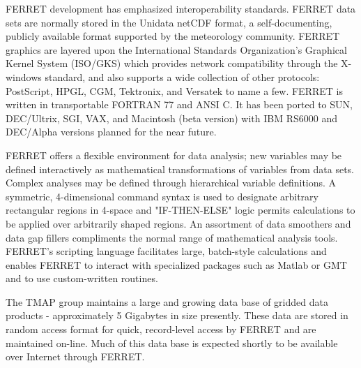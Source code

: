 	FERRET development has emphasized interoperability standards.  
FERRET data sets are normally stored in the Unidata netCDF format, a 
self-documenting, publicly available format supported by the meteorology 
community.  FERRET graphics are layered upon the International Standards 
Organization's Graphical Kernel System (ISO/GKS) which provides network 
compatibility through the X-windows standard, and also supports a wide 
collection of other protocols: PostScript, HPGL, CGM, Tektronix, and 
Versatek to name a few.  FERRET is written in transportable FORTRAN 77 
and ANSI C.  It has been ported to SUN, DEC/Ultrix, SGI, VAX, and Macintosh 
(beta version) with IBM RS6000 and DEC/Alpha versions planned for the 
near future. 

	FERRET offers a flexible environment for data analysis;  new 
variables may be defined interactively as mathematical transformations 
of variables from data sets.  Complex analyses may be defined through 
hierarchical variable definitions.  A symmetric, 4-dimensional command 
syntax is used to designate arbitrary rectangular regions in 4-space and 
"IF-THEN-ELSE" logic permits calculations to be applied over arbitrarily 
shaped regions.  An assortment of data smoothers and data gap fillers 
compliments the normal range of mathematical analysis tools.  FERRET's 
scripting language facilitates large, batch-style calculations and enables 
FERRET to interact with specialized packages such as Matlab or GMT and to 
use custom-written routines. 

	The TMAP group maintains a large and growing data base of gridded 
data products - approximately 5 Gigabytes in size presently.  These data 
are stored in random access format for quick, record-level access by 
FERRET and are maintained on-line.  Much of this data base is expected 
shortly to be available over Internet through FERRET.

